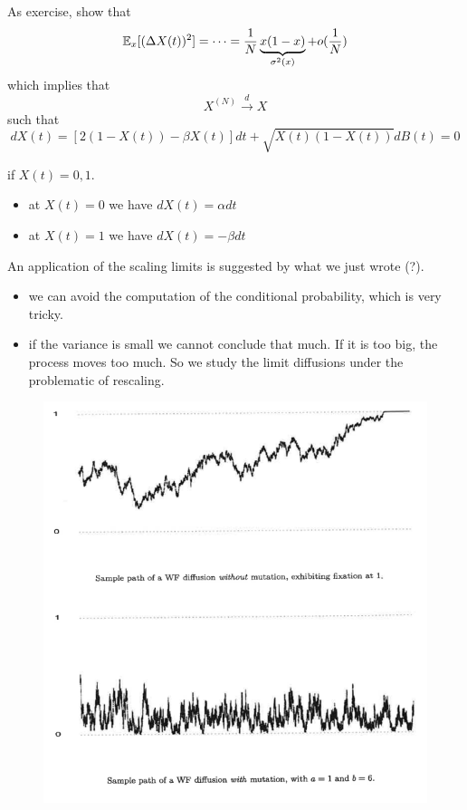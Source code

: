 \documentclass{article}
\begin{document}
\begin{enumerate}
	\begin{exercise}
	As exercise, show that 
	\begin{equation*}
		\mathbb{E}_x[(\Delta X(t))^2]= \dots = \frac{1}{N}
		\underbrace{x(1-x)}_{\sigma^2(x)} + o (\frac{1}{N})
	\end{equation*}
	which implies that 
	\begin{equation*}
		X^{(N)} \xrightarrow{d} X
	\end{equation*}
	such that 
	\begin{equation*}
		d X(t) = [2(1-X(t)) - \beta X(t)]dt + \sqrt{ X(t) (1-X(t))} dB(t) = 0
	\end{equation*}
\end{exercise}
	if $X(t) = 0,1$. 
	\begin{itemize}
		\item at $X(t)=0$ we have $dX(t)= \alpha dt$
		\item at $X(t)=1$ we have $dX(t)= -\beta dt$
	\end{itemize}
	\begin{figure}[H]
		\centering
		
	\end{figure}
	An application of the scaling limits is suggested by what we just wrote (?).\\
	\begin{itemize}
		\item we can avoid the computation of the conditional probability, which is very tricky.
		\item if the variance is small we cannot conclude that much. If it is too big, the process moves too much. So we study the limit diffusions under the problematic of rescaling. 
	\end{itemize}
	\end{enumerate}
	\begin{figure}[H]
		\centering
		\includegraphics[width=0.7\linewidth]{drawings/samplepaths.png}
	\end{figure}
\end{document}
